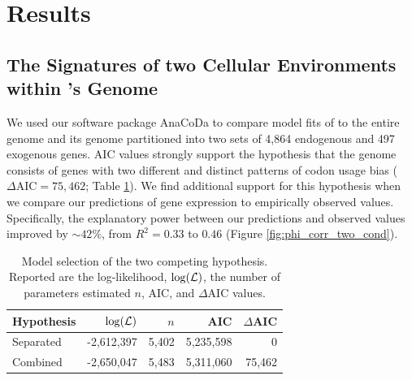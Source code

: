 \documentclass[fleqn,letterpaper]{article}
\begin{document}
\section*{Results}
\subsection*{The Signatures of two Cellular Environments within \kluyveri's Genome}
We used our software package AnaCoDa \citep{landerer2018} to compare model fits of \ROC to the entire \kluyveri genome and its genome partitioned into two sets of 4,864 endogenous and 497 exogenous genes.
AIC values strongly support the hypothesis that the \kluyveri genome consists of genes with two different and distinct patterns of codon usage bias ($\Delta\text{AIC} = 75,462$; Table \ref{tab:AIC_klu}).
We find additional support for this hypothesis when we compare our predictions of gene expression to empirically observed values.
Specifically, the explanatory power between our predictions and observed values improved by $\sim 42\%$, from $R^2 = 0.33$ to $0.46$ (Figure \ref{fig:phi_corr_two_cond}).

\begin{table}
  \centering
  \caption{Model selection of the two competing hypothesis. 
  Reported are the log-likelihood, $\log(\mathcal{L})$, the number of parameters estimated $n$, AIC, and $\Delta$AIC values.}
  \begin{tabular}{lrrrr}
    \hline
    Hypothesis             & $\log(\mathcal{L})$ &$n$ &  AIC & $\Delta$AIC\\ \hline 
    Separated		   & -2,612,397 & 5,402 & 5,235,598&      0\\
    Combined               & -2,650,047 & 5,483 & 5,311,060& 75,462\\ \hline
  \end{tabular}
  \label{tab:AIC_klu}
\end{table}
\clearpage
\end{document}
